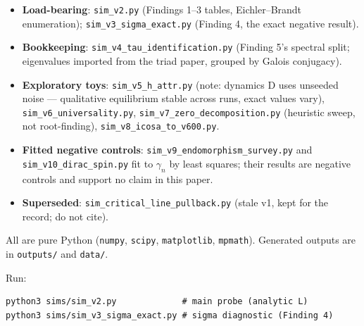 \documentclass[11pt,a4paper]{article}
\begin{document}
{\sloppy
\begin{itemize}[leftmargin=*]
  \item \textbf{Load-bearing}: \texttt{sim\_v2.py} (Findings
        1--3 tables, Eichler--Brandt enumeration);
        \texttt{sim\_v3\_sigma\_exact.py} (Finding 4, the exact
        negative result).
  \item \textbf{Bookkeeping}: \texttt{sim\_v4\_tau\_identification.py}
        (Finding 5's spectral split; eigenvalues imported from the
        triad paper, grouped by Galois conjugacy).
  \item \textbf{Exploratory toys}: \texttt{sim\_v5\_h\_attr.py}
        (note: dynamics D uses unseeded noise --- qualitative
        equilibrium stable across runs, exact values vary),
        \texttt{sim\_v6\_universality.py},
        \texttt{sim\_v7\_zero\_decomposition.py} (heuristic
        sweep, not root-finding),
        \texttt{sim\_v8\_icosa\_to\_v600.py}.
  \item \textbf{Fitted negative controls}:
        \texttt{sim\_v9\_endomorphism\_survey.py} and
        \texttt{sim\_v10\_dirac\_spin.py} fit to $\gamma_n$ by
        least squares; their results are negative controls and
        support no claim in this paper.
  \item \textbf{Superseded}: \texttt{sim\_critical\_line\_pullback.py}
        (stale v1, kept for the record; do not cite).
\end{itemize}}

All are pure Python (\texttt{numpy}, \texttt{scipy},
\texttt{matplotlib}, \texttt{mpmath}). Generated outputs are in
\texttt{outputs/} and \texttt{data/}.

Run:
\begin{verbatim}
python3 sims/sim_v2.py             # main probe (analytic L)
python3 sims/sim_v3_sigma_exact.py # sigma diagnostic (Finding 4)
\end{verbatim}



\end{document}
